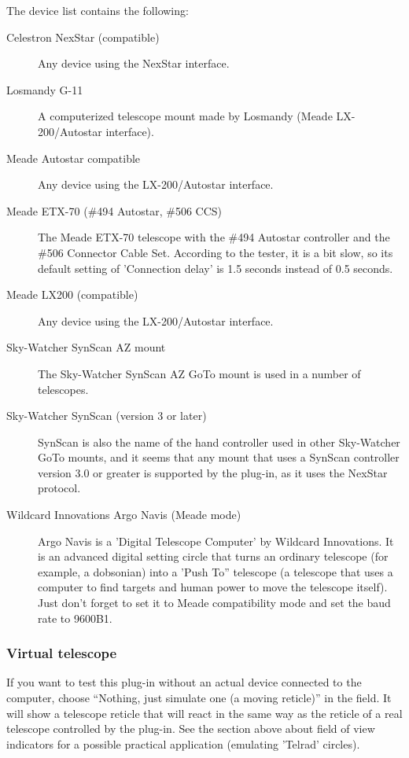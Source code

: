 The device list contains the following:
\begin{description}
\item[Celestron NexStar (compatible)] Any device using the NexStar
  interface.
\item[Losmandy G-11] A computerized telescope mount made by Losmandy
  (Meade LX-200/Autostar interface).
\item[Meade Autostar compatible] Any device using the LX-200/Autostar
  interface.
\item[Meade ETX-70 (\#494 Autostar, \#506 CCS)] The Meade ETX-70
  telescope with the \#494 Autostar controller and the \#506 Connector
  Cable Set. According to the tester, it is a bit slow, so its default
  setting of 'Connection delay' is 1.5 seconds instead of 0.5 seconds.
\item[Meade LX200 (compatible)] Any device using the LX-200/Autostar
  interface.
\item[Sky-Watcher SynScan AZ mount] The Sky-Watcher SynScan AZ GoTo
  mount is used in a number of telescopes.
\item[Sky-Watcher SynScan (version 3 or later)] SynScan is also the
  name of the hand controller used in other Sky-Watcher GoTo mounts,
  and it seems that any mount that uses a SynScan controller version
  3.0 or greater is supported by the plug-in, as it uses the NexStar
  protocol.
\item[Wildcard Innovations Argo Navis (Meade mode)] Argo Navis is a
  'Digital Telescope Computer' by Wildcard Innovations. It is an
  advanced digital setting circle that turns an ordinary telescope
  (for example, a dobsonian) into a 'Push To'' telescope (a telescope
  that uses a computer to find targets and human power to move the
  telescope itself). Just don't forget to set it to Meade
  compatibility mode and set the baud rate to 9600B1.
\end{description}


\subsubsection{Virtual telescope}
If you want to test this plug-in without an actual device connected to
the computer, choose ``Nothing, just simulate one (a moving reticle)'' in
the  field. It will show a telescope reticle
that will react in the same way as the reticle of a real telescope
controlled by the plug-in.  See the section above about field of view
indicators for a possible practical application (emulating 'Telrad'
circles).  

